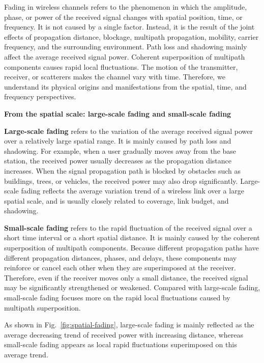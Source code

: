 
Fading in wireless channels refers to the phenomenon in which the amplitude,
phase,
or power of the received signal changes with spatial position,
time,
or frequency.
It is not caused by a single factor.
Instead,
it is the result of the joint effects of propagation distance,
blockage,
multipath propagation,
mobility,
carrier frequency,
and the surrounding environment.
Path loss and shadowing mainly affect the average received signal power.
Coherent superposition of multipath components causes rapid local fluctuations.
The motion of the transmitter,
receiver,
or scatterers makes the channel vary with time.
Therefore,
we understand its physical origins and manifestations from the spatial,
time,
and frequency perspectives.


\noindent\textbullet\quad\textbf{From the spatial scale: large-scale fading and small-scale fading}

\textbf{Large-scale fading} refers to the variation of the average received signal power over a relatively large spatial range.
It is mainly caused by path loss and shadowing.
For example,
when a user gradually moves away from the base station,
the received power usually decreases as the propagation distance increases.
When the signal propagation path is blocked by obstacles such as buildings,
trees,
or vehicles,
the received power may also drop significantly.
Large-scale fading reflects the average variation trend of a wireless link over a large spatial scale,
and is usually closely related to coverage,
link budget,
and shadowing.

\textbf{Small-scale fading} refers to the rapid fluctuation of the received signal over a short time interval
or a short spatial distance.
It is mainly caused by the coherent superposition of multipath components.
Because different propagation paths have different propagation distances,
phases,
and delays,
these components may reinforce or cancel each other when they are superimposed at the receiver.
Therefore,
even if the receiver moves only a small distance,
the received signal may be significantly strengthened or weakened.
Compared with large-scale fading,
small-scale fading focuses more on the rapid local fluctuations caused by multipath superposition.

As shown in Fig.~\ref{fig:spatial-fading},
large-scale fading is mainly reflected as the average decreasing trend of received power with increasing distance,
whereas small-scale fading appears as local rapid fluctuations superimposed on this average trend.

